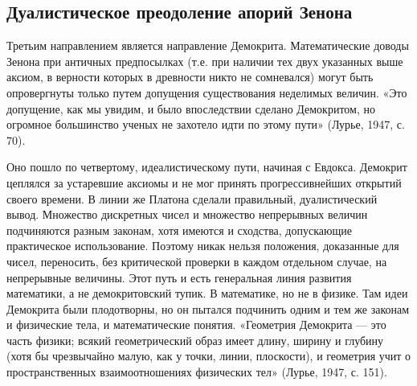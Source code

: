 \subsection{Дуалистическое преодоление апорий Зенона}

Третьим направлением является направление Демокрита.
Математические доводы Зенона при античных предпосылках (т.е. при
наличии тех двух указанных выше аксиом, в верности которых в древности
никто не сомневался) могут быть опровергнуты только путем допущения
существования неделимых величин. «Это допущение, как мы увидим, и было
впоследствии сделано Демокритом, но огромное большинство ученых не
захотело идти по этому пути» (Лурье, 1947, с. 70).

Оно пошло по четвертому, идеалистическому пути, начиная с Евдокса.
Демокрит цеплялся за устаревшие аксиомы и не мог принять
прогрессивнейших открытий своего времени. В линии же Платона сделали
правильный, дуалистический вывод. Множество дискретных чисел и
множество непрерывных величин подчиняются разным законам, хотя имеются
и сходства, допускающие практическое использование. Поэтому никак
нельзя положения, доказанные для чисел, переносить, без критической
проверки в каждом отдельном случае, на непрерывные величины. Этот путь
и есть генеральная линия развития математики, а не демокритовский
тупик. В математике, но не в физике. Там идеи Демокрита были
плодотворны, но он пытался подчинить одним и тем же законам и
физические тела, и математические понятия. «Геометрия Демокрита ---
это часть физики; всякий геометрический образ имеет длину, ширину и
глубину (хотя бы чрезвычайно малую, как у точки, линии, плоскости), и
геометрия учит о пространственных взаимоотношениях физических тел»
(Лурье, 1947, с. 151).

